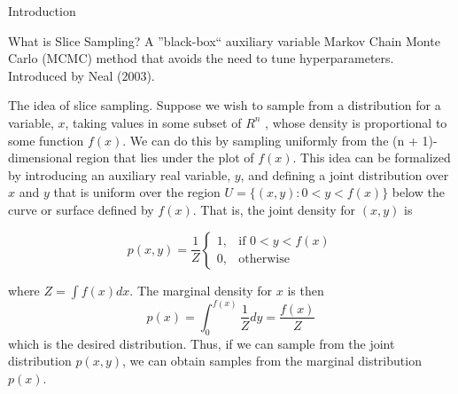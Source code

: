 \documentclass[aspectratio=169]{beamer}
\begin{document}
\begin{frame}{Introduction}

	\begin{block}{What is Slice Sampling?}
		A ''black-box`` auxiliary variable Markov Chain Monte Carlo (MCMC) method that
		avoids the need to tune hyperparameters. Introduced by Neal (2003).
	\end{block}

	The idea of slice sampling. Suppose we wish to sample from a distribution for a
	variable, $x$, taking values in some subset of $R^n$ , whose density is proportional
	to some function $f (x)$. We can do this by sampling uniformly from the
	(n + 1)-dimensional region that lies under the plot of $f (x)$. This idea can be
	formalized by introducing an auxiliary real variable, $y$, and deﬁning a joint
	distribution over $x$ and $y$ that is uniform over the region
	$U = \{ (x,y):0 < y < f (x) \}$ below the curve or surface deﬁned
	by $f (x)$. That is, the joint density for $(x,y)$ is

	\begin{equation*}
		p(x,y) = \frac{1}{Z} \begin{cases}
			1, & \text{if } 0 < y < f(x) \\
			0, & \text{otherwise}
		\end{cases}
	\end{equation*}

	where $Z = \int f(x)dx$. The marginal density for $x$ is then
	\begin{equation*}
		p(x) = \int_0^{f(x)} \frac{1}{Z} dy = \frac{f(x)}{Z}
	\end{equation*}
	which is the desired distribution. Thus, if we can sample from the joint
	distribution $p(x,y)$, we can obtain samples from the marginal distribution $p(x)$.


\end{frame}
\end{document}
